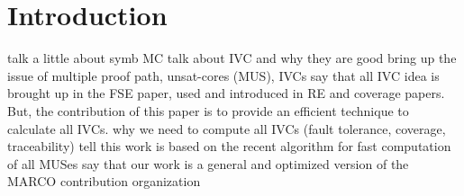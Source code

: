 \section{Introduction}
\label{sec:intro}

talk a little about symb MC
talk about IVC and why they are good
bring up the issue of multiple proof path, unsat-cores (MUS), IVCs
say that all IVC idea is brought up in the FSE paper, used and introduced in RE and coverage papers. But, the contribution of this paper is to provide an efficient technique to calculate all IVCs.
why we need to compute all IVCs (fault tolerance, coverage, traceability)
tell this work is based on the recent algorithm for fast computation of all MUSes
say that our work is a general and optimized version of the MARCO
contribution
organization

